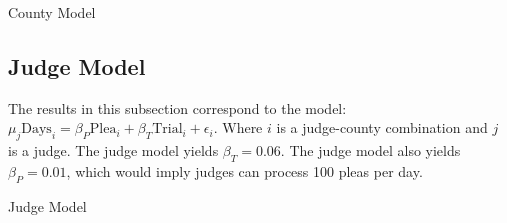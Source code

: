 \documentclass[11pt]{article}
\begin{document}
    \begin{table}[H]
      \centering
      \caption{County Model}
      
    \end{table}

    \subsection{Judge Model}
      The results in this subsection correspond to the model: $\mu_j \text{Days}_i = \beta_P \text{Plea}_i + \beta_T \text{Trial}_i + \epsilon_i$. Where $i$ is a judge-county combination and $j$ is a judge. The judge model yields $\beta_T=0.06$. The judge model also yields $\beta_P=0.01$, which would imply judges can process 100 pleas per day.

      \begin{table}[H]
        \centering
        \small
        \caption{Judge Model}
        
      \end{table}
\end{document}
